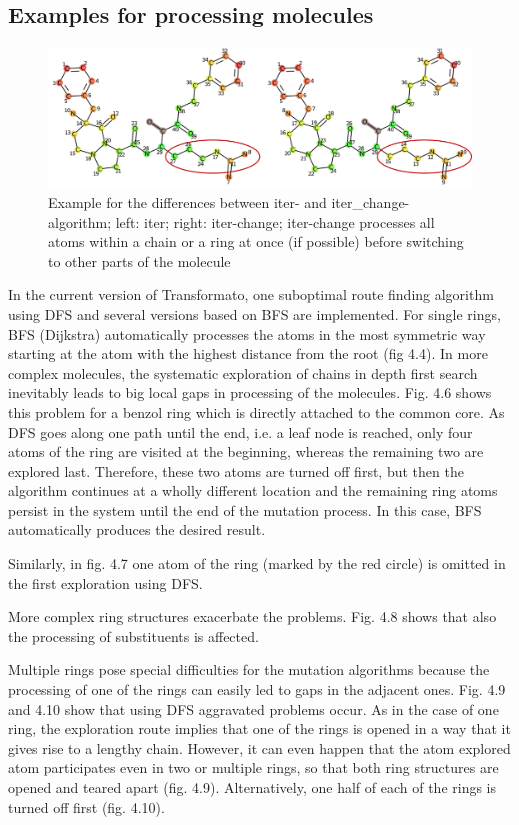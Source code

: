 \subsection{Examples for processing molecules}

\begin{figure}
\includegraphics[scale=0.5]{iter_iter_change_1a5g_1}

\caption{Example for the differences between iter- and iter\_change-algorithm;
left: iter; right: iter-change; iter-change processes all atoms within
a chain or a ring at once (if possible) before switching to other
parts of the molecule}
\end{figure}

In the current version of Transformato, one suboptimal route finding algorithm using DFS and several versions based on BFS are implemented.
For single rings, BFS (Dijkstra) automatically processes the atoms in the most symmetric way starting at the atom with the highest distance from the root (fig 4.4).
In more complex molecules, the systematic exploration of chains in
depth first search inevitably leads to big local gaps in processing
of the molecules. Fig. 4.6 shows this problem for a benzol ring which
is directly attached to the common core. As DFS goes along one path
until the end, i.e. a leaf node is reached, only four atoms of the
ring are visited at the beginning, whereas the remaining two are explored
last. Therefore, these two atoms are turned off first, but then the
algorithm continues at a wholly different location and the remaining
ring atoms persist in the system until the end of the mutation process.
In this case, BFS automatically produces the desired result. 

Similarly, in fig. 4.7 one atom of the ring (marked by the red circle)
is omitted in the first exploration using DFS.

More complex ring structures exacerbate the problems. Fig. 4.8 shows that also the processing of substituents is affected.

Multiple rings pose special difficulties for the mutation algorithms because
the processing of one of the rings can easily led to gaps in the adjacent
ones. Fig. 4.9 and 4.10 show that using DFS aggravated problems occur.
As in the case of one ring, the exploration route implies that one
of the rings is opened in a way that it gives rise to a lengthy chain.
However, it can even happen that the atom explored atom participates
even in two or multiple rings, so that both ring structures are opened
and teared apart (fig. 4.9). Alternatively, one half of each of the
rings is turned off first (fig. 4.10). 

